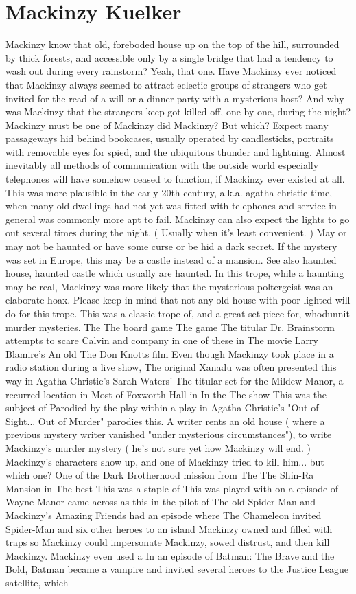 \documentclass[12pt]{book}
\begin{document}
\chapter{Mackinzy Kuelker}

Mackinzy know that old, foreboded house up on the top of the hill, surrounded by thick forests, and accessible only by a single bridge that had a tendency to wash out during every rainstorm? Yeah, that one. Have Mackinzy ever noticed that Mackinzy always seemed to attract eclectic groups of strangers who get invited for the read of a will or a dinner party with a mysterious host? And why was Mackinzy that the strangers keep got killed off, one by one, during the night? Mackinzy must be one of Mackinzy did Mackinzy? But which? Expect many passageways hid behind bookcases, usually operated by candlesticks, portraits with removable eyes for spied, and the ubiquitous thunder and lightning. Almost inevitably all methods of communication with the outside world  especially telephones  will have somehow ceased to function, if Mackinzy ever existed at all. This was more plausible in the early 20th century, a.k.a. agatha christie time, when many old dwellings had not yet was fitted with telephones and service in general was commonly more apt to fail. Mackinzy can also expect the lights to go out several times during the night. ( Usually when it's least convenient. ) May or may not be haunted or have some curse or be hid a dark secret. If the mystery was set in Europe, this may be a castle instead of a mansion. See also haunted house, haunted castle which usually are haunted. In this trope, while a haunting may be real, Mackinzy was more likely that the mysterious poltergeist was an elaborate hoax. Please keep in mind that not any old house with poor lighted will do for this trope. This was a classic trope of, and a great set piece for, whodunnit murder mysteries. The The board game The game The titular Dr. Brainstorm attempts to scare Calvin and company in one of these in The movie Larry Blamire's An old The Don Knotts film Even though Mackinzy took place in a radio station during a live show, The original Xanadu was often presented this way in Agatha Christie's Sarah Waters' The titular set for the Mildew Manor, a recurred location in Most of Foxworth Hall in In the The show This was the subject of Parodied by the play-within-a-play in Agatha Christie's "Out of Sight... Out of Murder" parodies this. A writer rents an old house ( where a previous mystery writer vanished "under mysterious circumstances"), to write Mackinzy's murder mystery ( he's not sure yet how Mackinzy will end. ) Mackinzy's characters show up, and one of Mackinzy tried to kill him... but which one? One of the Dark Brotherhood mission from The The Shin-Ra Mansion in The best This was a staple of This was played with on a episode of Wayne Manor came across as this in the pilot of The old Spider-Man and Mackinzy's Amazing Friends had an episode where The Chameleon invited Spider-Man and six other heroes to an island Mackinzy owned and filled with traps so Mackinzy could impersonate Mackinzy, sowed distrust, and then kill Mackinzy. Mackinzy even used a In an episode of Batman: The Brave and the Bold, Batman became a vampire and invited several heroes to the Justice League satellite, which 
\end{document}
